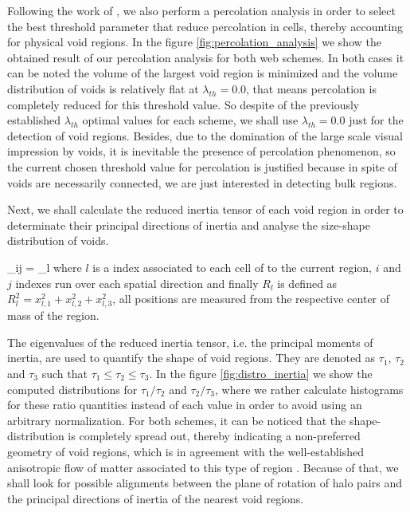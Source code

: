 \documentclass[usenatbib]{latex/mn2e}
\begin{document}
Following the work of , we also perform a 
percolation analysis in order to select the best threshold parameter that
reduce percolation in cells, thereby accounting for physical void regions.
In the figure \ref{fig:percolation_analysis} we show the obtained result 
of our percolation analysis for both web schemes. In both cases it can be 
noted the volume of the largest void region is minimized and the volume 
distribution of voids is relatively flat at $\lambda_{th} = 0.0$, that 
means percolation is completely reduced for this threshold value. So 
despite of the previously established $\lambda_{th}$ optimal values for 
each scheme, we shall use $\lambda_{th} = 0.0$ just for the detection of 
void regions. Besides, due to the domination of the large scale visual 
impression by voids, it is inevitable the presence of percolation 
phenomenon, so the current chosen threshold value for percolation is 
justified because in spite of voids are necessarily connected, we are just 
interested in detecting bulk regions.



Next, we shall calculate the reduced inertia tensor of each void region 
in order to determinate their principal directions of inertia and analyse 
the size-shape distribution of voids.


{ \tau_{ij} = \sum_l  }
where $l$ is a index associated to each cell of to the current region, 
$i$ and $j$ indexes run over each spatial direction and finally 
$R_l$ is defined as $R_l^2 = x_{l,1}^2 + x_{l,2}^2 + x_{l,3}^2$, all 
positions are measured from the respective center of mass of the region.



The eigenvalues of the reduced inertia tensor, i.e. the principal moments
of inertia, are used to quantify the shape of void regions. They are 
denoted as $\tau_1$, $\tau_2$ and $\tau_3$ such that $\tau_1 \leq \tau_2
\leq \tau_3$. In the figure \ref{fig:distro_inertia} we show the computed
distributions for $\tau_1/\tau_2$ and $\tau_2/\tau_3$, where we rather 
calculate histograms for these ratio quantities instead of each value in 
order to avoid using an arbitrary normalization. For both schemes, it can 
be noticed that the shape-distribution is completely spread out, thereby 
indicating a non-preferred geometry of void regions, which is in agreement 
with the well-established anisotropic flow of matter associated to this 
type of region . Because of that, we shall look 
for possible alignments between the plane of rotation of halo pairs and
the principal directions of inertia of the nearest void regions.
\end{document}

